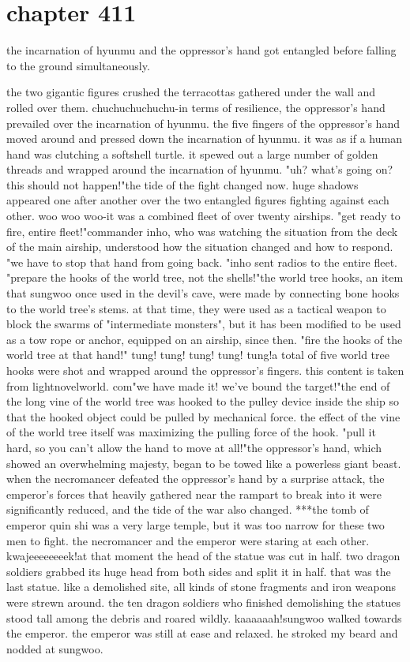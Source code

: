 \section{chapter 411}

the incarnation of hyunmu and the oppressor's hand got entangled before falling to the ground simultaneously.
 




the two gigantic figures crushed the terracottas gathered under the wall and rolled over them.
chuchuchuchuchu-in terms of resilience, the oppressor's hand prevailed over the incarnation of hyunmu.
 the five fingers of the oppressor's hand moved around and pressed down the incarnation of hyunmu.
 it was as if a human hand was clutching a softshell turtle.
 it spewed out a large number of golden threads and wrapped around the incarnation of hyunmu.
"uh? what's going on? this should not happen!"the tide of the fight changed now.
 huge shadows appeared one after another over the two entangled figures fighting against each other.
 woo woo woo-it was a combined fleet of over twenty airships.
"get ready to fire, entire fleet!"commander inho, who was watching the situation from the deck of the main airship, understood how the situation changed and how to respond.
"we have to stop that hand from going back.
"inho sent radios to the entire fleet.
"prepare the hooks of the world tree, not the shells!"the world tree hooks, an item that sungwoo once used in the devil's cave, were made by connecting bone hooks to the world tree's stems.
at that time, they were used as a tactical weapon to block the swarms of "intermediate monsters", but it has been modified to be used as a tow rope or anchor, equipped on an airship, since then.
"fire the hooks of the world tree at that hand!"
tung! tung! tung! tung! tung!a total of five world tree hooks were shot and wrapped around the oppressor's fingers.
this content is taken from lightnovelworld.
com"we have made it! we've bound the target!"the end of the long vine of the world tree was hooked to the pulley device inside the ship so that the hooked object could be pulled by mechanical force.
 the effect of the vine of the world tree itself was maximizing the pulling force of the hook.
"pull it hard, so you can't allow the hand to move at all!"the oppressor's hand, which showed an overwhelming majesty, began to be towed like a powerless giant beast.
when the necromancer defeated the oppressor's hand by a surprise attack, the emperor's forces that heavily gathered near the rampart to break into it were significantly reduced, and the tide of the war also changed.
***the tomb of emperor quin shi was a very large temple, but it was too narrow for these two men to fight.
 the necromancer and the emperor were staring at each other.
kwajeeeeeeeek!at that moment the head of the statue was cut in half.
 two dragon soldiers grabbed its huge head from both sides and split it in half.
 that was the last statue.
like a demolished site, all kinds of stone fragments and iron weapons were strewn around.
the ten dragon soldiers who finished demolishing the statues stood tall among the debris and roared wildly.
kaaaaaah!sungwoo walked towards the emperor.
 the emperor was still at ease and relaxed.
 he stroked my beard and nodded at sungwoo.
 
